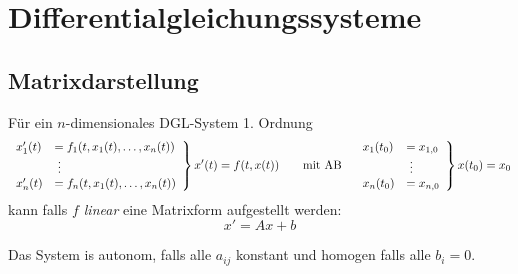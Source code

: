 \section{Differentialgleichungssysteme}

\subsection{Matrixdarstellung}
Für ein $n$-dimensionales DGL-System 1. Ordnung
\begin{equation*}
    \left.
    \begin{array}{ll}
        x_1'(t) &= f_1(t,x_1(t),\ldots,x_n(t)) \\
        &\hspace{1mm}\vdots \\
        x_n'(t) &= f_n(t,x_1(t),\ldots,x_n(t)) \\
    \end{array}
    \right\}
    x'(t) = f(t,x(t))
    \qquad \text{mit AB} \quad
    \left.
    \begin{array}{ll}
        x_1(t_0) &= x_{1,0} \\
        &\hspace{1mm}\vdots \\
        x_n(t_0) &= x_{n,0} \\
    \end{array}
    \right\}
    x(t_0) = x_0    
\end{equation*}
kann falls \emph{$f$ linear} eine Matrixform aufgestellt werden:
\[ x' = Ax + b \]

Das System is autonom, falls alle $a_{ij}$ konstant und homogen falls alle $b_i=0$.

